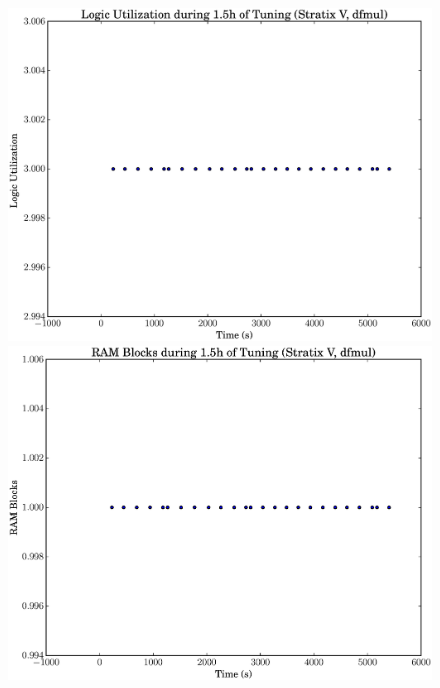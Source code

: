 \documentclass[12pt, a4paper]{article}
\begin{document}
\begin{figure}[htpb]
    \centering
    \noindent
    \begin{minipage}{.48\textwidth}
        \centering
        \includegraphics[scale=.25]{dfmul_lu_5400_chstone_StratixV}
    \end{minipage}%
    \hfill
    \begin{minipage}{.48\textwidth}
        \centering
        \includegraphics[scale=.25]{dfmul_ram_5400_chstone_StratixV}
    \end{minipage}%


\end{figure}
\end{document}
